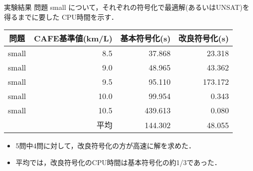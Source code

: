 \documentclass[dvipdfmx, 11pt]{beamer}
\begin{document}
\begin{frame}{実験結果}
 問題 small について，それぞれの符号化で最適解(あるいはUNSAT)を
 得るまでに要した CPU時間を示す．
 \begin{exampleblock}{} \centering 
  \begin{tabular}{crrr}
   問題		& CAFE基準値(km/L)  & 基本符号化(s)   & 改良符号化(s)    \\\hline
   small 	& 8.5              & 37.868         & \alert{23.318}  \\
   small	& 9.0              & 48.965         & \alert{43.362}  \\
   small	& 9.5              & \alert{95.110} & 173.172         \\
   small	& 10.0             & 99.954         & \alert{0.343}   \\
   small	& 10.5             & 439.613        & \alert{0.080}   \\\hline
   \multicolumn{2}{r}{平均}         & 144.302        & \alert{48.055}
  \end{tabular}
 \end{exampleblock}
 \begin{itemize}
  \item 5問中4問に対して，改良符号化の方が高速に解を求めた．
  \item 平均では，改良符号化のCPU時間は基本符号化の約1/3であった．
 \end{itemize}
\end{frame}
\end{document}
